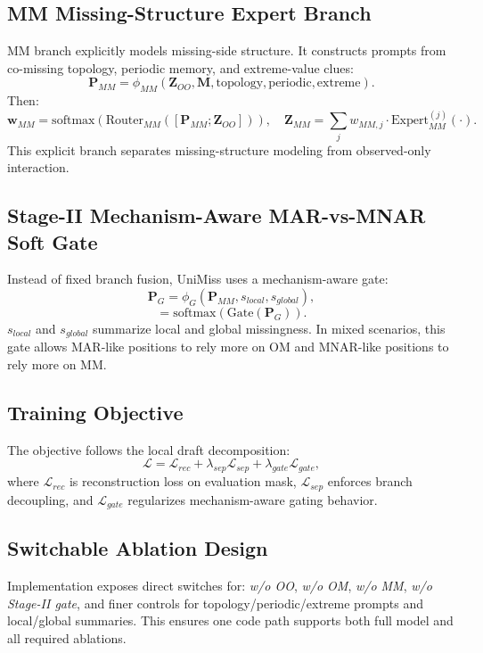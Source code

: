 \subsection{MM Missing-Structure Expert Branch}
MM branch explicitly models missing-side structure. It constructs prompts from co-missing topology, periodic memory, and extreme-value clues:
\begin{equation}
\mathbf{P}_{MM}=\phi_{MM}(\mathbf{Z}_{OO},\mathbf{M},\text{topology},\text{periodic},\text{extreme}).
\end{equation}
Then:
\begin{equation}
\mathbf{w}_{MM}=\mathrm{softmax}\left(\mathrm{Router}_{MM}([\mathbf{P}_{MM};\mathbf{Z}_{OO}])\right),\quad
\mathbf{Z}_{MM}=\sum_{j}w_{MM,j}\cdot \mathrm{Expert}^{(j)}_{MM}(\cdot).
\end{equation}
This explicit branch separates missing-structure modeling from observed-only interaction.

\subsection{Stage-II Mechanism-Aware MAR-vs-MNAR Soft Gate}
Instead of fixed branch fusion, UniMiss uses a mechanism-aware gate:
\begin{equation}
\mathbf{P}_{G}=\phi_G(\mathbf{P}_{MM}, s_{local}, s_{global}),
\end{equation}
\begin{equation}
[\beta_{OM},\beta_{MM}]=\mathrm{softmax}\left(\mathrm{Gate}(\mathbf{P}_{G})\right).
\end{equation}
$s_{local}$ and $s_{global}$ summarize local and global missingness. In mixed scenarios, this gate allows MAR-like positions to rely more on OM and MNAR-like positions to rely more on MM.

\subsection{Training Objective}
The objective follows the local draft decomposition:
\begin{equation}
\mathcal{L}=\mathcal{L}_{rec}+\lambda_{sep}\mathcal{L}_{sep}+\lambda_{gate}\mathcal{L}_{gate},
\end{equation}
where $\mathcal{L}_{rec}$ is reconstruction loss on evaluation mask, $\mathcal{L}_{sep}$ enforces branch decoupling, and $\mathcal{L}_{gate}$ regularizes mechanism-aware gating behavior.

\subsection{Switchable Ablation Design}
Implementation exposes direct switches for:
\textit{w/o OO}, \textit{w/o OM}, \textit{w/o MM}, \textit{w/o Stage-II gate}, and finer controls for topology/periodic/extreme prompts and local/global summaries. This ensures one code path supports both full model and all required ablations.
